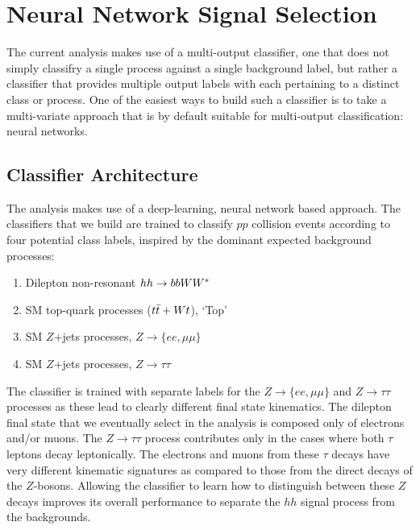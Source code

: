 \section{Neural Network Signal Selection}
\label{sec:hh_strategy}

%
%


The current analysis makes use of a multi-output classifier, one that does not simply classifry
a single process against a single background label, but rather a classifier that provides multiple
output labels with each pertaining to a distinct class or process.
One of the easiest ways to build such a classifier is to take a multi-variate approach that
is by default suitable for multi-output classification: neural networks.

\subsection{Classifier Architecture}
\label{sec:nn_arch}

The analysis makes use of a deep-learning, neural network based approach.
The classifiers that we build are trained to classify $pp$ collision events according to
four potential class labels, inspired by the dominant expected background processes:
\begin{enumerate}
    \item Dilepton non-resonant $hh \rightarrow bbWW^*$
    \item SM top-quark processes ($t\bar{t} + Wt$), `Top'
    \item SM $Z$+jets processes, $Z \rightarrow \{ee,\mu\mu\}$
    \item SM $Z$+jets processes, $Z \rightarrow \tau\tau$
\end{enumerate}
The classifier is trained with separate labels for the $Z \rightarrow \{ee,\mu\mu\}$ and
$Z \rightarrow \tau\tau$ processes as these lead to clearly different final state kinematics.
The dilepton final state that we eventually select in the analysis is composed only of electrons and/or muons.
The $Z \rightarrow \tau\tau$ process contributes only in the cases where both $\tau$ leptons decay
leptonically.
The electrons and muons from these $\tau$ decays have very different kinematic signatures as compared
to those from the direct decays of the $Z$-bosons.
Allowing the classifier to learn how to distinguish between these $Z$ decays improves its overall performance
to separate the $hh$ signal process from the backgrounds.

